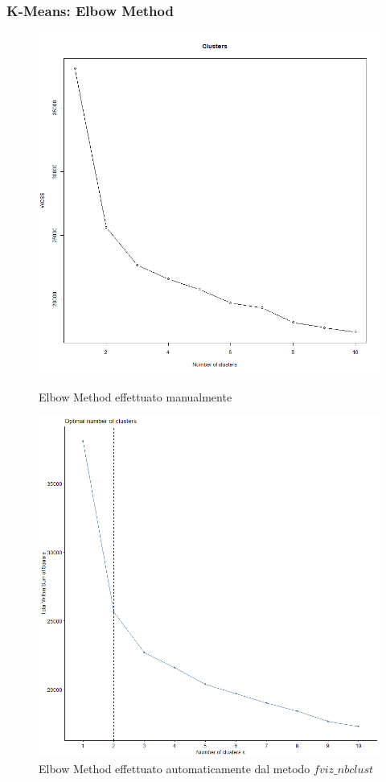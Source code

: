 \begin{frame}[fragile]
\frametitle{K-Means: Elbow Method}
\begin{figure}[H]
   \begin{minipage}{0.48\textwidth}
     \centering
     \includegraphics[width=0.8\linewidth]{Img/KMEANS001.png}
     \caption{Elbow Method effettuato manualmente}\label{fig:Elbow1}
   \end{minipage}\hfill
   \begin{minipage}{0.48\textwidth}
     \centering
     \includegraphics[width=0.8\linewidth]{Img/KMEANS002.png}
     \caption{Elbow Method effettuato automaticamente dal metodo $fviz\_nbclust$}\label{fig:Elbow2}
   \end{minipage}
\end{figure}
\end{frame}
